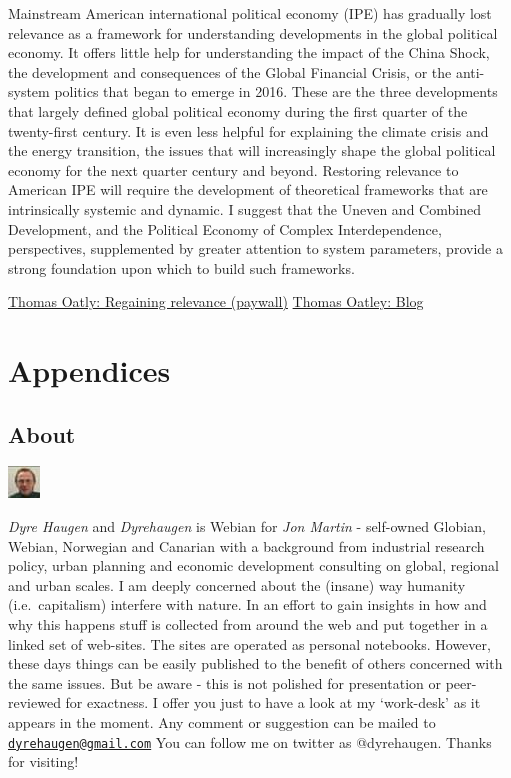 \documentclass[
]{book}
\begin{document}
Mainstream American international political economy (IPE) has gradually lost relevance as a framework for understanding developments in the global political economy. It offers little help for understanding the impact of the China Shock, the development and consequences of the Global Financial Crisis, or the anti-system politics that began to emerge in 2016. These are the three developments that largely defined global political economy during the first quarter of the twenty-first century. It is even less helpful for explaining the climate crisis and the energy transition, the issues that will increasingly shape the global political economy for the next quarter century and beyond. Restoring relevance to American IPE will require the development of theoretical frameworks that are intrinsically systemic and dynamic. I suggest that the Uneven and Combined Development, and the Political Economy of Complex Interdependence, perspectives, supplemented by greater attention to system parameters, provide a strong foundation upon which to build such frameworks.

\href{https://www.tandfonline.com/doi/abs/10.1080/09557571.2021.1888880?journalCode=ccam20}{Thomas Oatly: Regaining relevance (paywall)}
\href{https://www.thomasoatley.org/blog/}{Thomas Oatley: Blog}

\hypertarget{part-appendices}{%
\part{Appendices}\label{part-appendices}}

\hypertarget{appendix-appendices}{%
\appendix}


\hypertarget{about}{%
\chapter{About}\label{about}}

\includegraphics{fig/me.jpg}

\emph{Dyre Haugen} and \emph{Dyrehaugen} is Webian for \emph{Jon Martin} -
self-owned Globian, Webian, Norwegian and Canarian with
a background from industrial research policy, urban planning and
economic development consulting on global, regional and urban scales.
I am deeply concerned about the (insane) way
humanity (i.e.~capitalism) interfere with nature.
In an effort to gain insights in how and why this happens
stuff is collected from around the web and put together
in a linked set of web-sites.
The sites are operated as personal notebooks.
However, these days things can be easily published to the
benefit of others concerned with the same issues.
But be aware - this is not polished for presentation or
peer-reviewed for exactness.
I offer you just to have a look at my `work-desk' as it appears in the moment.
Any comment or suggestion can be mailed to \href{mailto:dyrehaugen@gmail.com}{\nolinkurl{dyrehaugen@gmail.com}}
You can follow me on twitter as @dyrehaugen.
Thanks for visiting!
\end{document}
